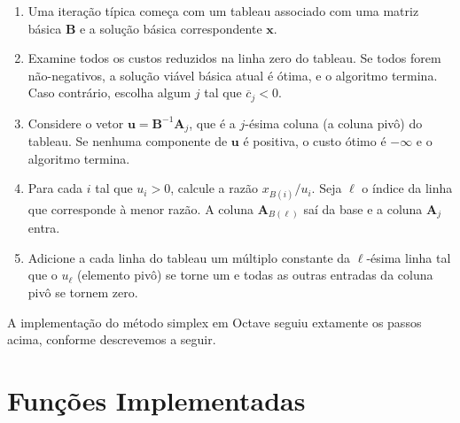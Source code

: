 \documentclass[12pt,a4paper]{article}
\newcommand{\vet}{\mathbf}                                   %
\newcommand{\zerar}{\setcounter{equation}{0}\setcounter{figure}{0}\setcounter{table}{0}}
\begin{document}
\label{iteracao}
\vspace{-0.2cm}
\begin{enumerate}
	\item Uma iteração típica começa com um tableau associado com uma matriz básica $\vet{B}$ e a 
	solução básica correspondente $\vet{x}$.
	\item Examine todos os custos reduzidos na linha zero do tableau. Se todos forem não-negativos,
	a solução viável básica atual é ótima, e o algoritmo termina. Caso contrário, escolha algum $j$
	tal que $\overline{c}_j < 0$.
	\item Considere o vetor $\vet{u} = \vet{B}^{-1}\vet{A}_j$, que é a $j$-ésima coluna (a coluna 
	pivô) do tableau. Se nenhuma componente de $\vet{u}$ é positiva, o custo ótimo é $-\infty$ e o 
	algoritmo termina.
	\item Para cada $i$ tal que $u_i > 0$, calcule a razão $x_{B(i)}/u_i$. Seja $\ell$ o índice da 
	linha que corresponde à menor razão. A coluna $\vet{A}_{B(\ell)}$ saí da base e a coluna 
	$\vet{A}_j$ entra.
	\item Adicione a cada linha do tableau um múltiplo constante da $\ell$-ésima linha tal que o 
	$u_\ell$ (elemento pivô) se torne um e todas as outras entradas da coluna pivô se tornem zero. 
\end{enumerate}

A implementação do método simplex em Octave seguiu extamente os passos acima, conforme descrevemos
a seguir.


\zerar
\section{Funções Implementadas}
\label{sec:funcoes}
\end{document}
